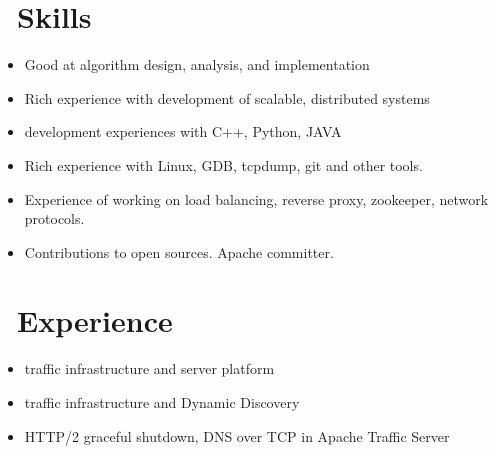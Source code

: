 \documentclass{resume}
\begin{document}



\section{\faCogs\ Skills}
\begin{itemize}[parsep=0.5ex]
        \item Good at algorithm design, analysis, and implementation
        \item Rich experience with development of scalable, distributed systems
        \item development experiences with C++, Python, JAVA
        \item Rich experience with Linux, GDB, tcpdump, git and other tools.
        \item Experience of working on load balancing, reverse proxy, zookeeper, network protocols.
        \item Contributions to open sources. Apache committer.
\end{itemize}

\section{\faUsers\ Experience}
 {}{}
\begin{itemize}
    \item traffic infrastructure and server platform
\end{itemize}

 {}{}
\begin{itemize}
    \item traffic infrastructure and Dynamic Discovery
\end{itemize}

 {}{}
\begin{itemize}
    \item HTTP/2 graceful shutdown, DNS over TCP in Apache Traffic Server
\end{itemize}
\end{document}

